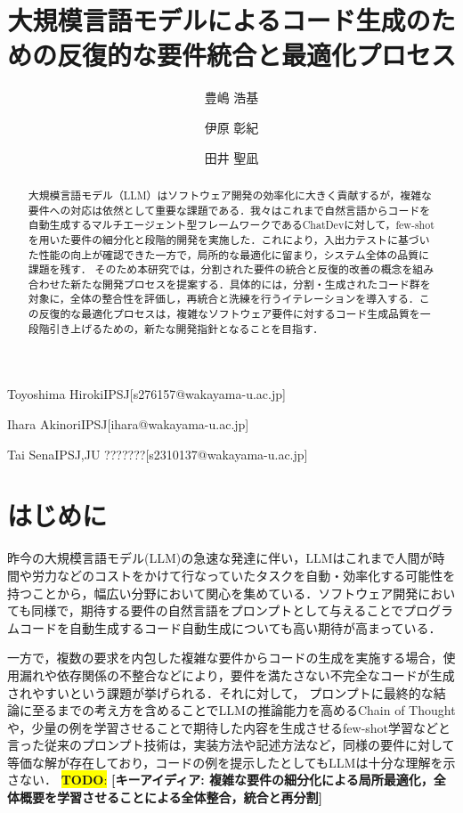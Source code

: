 \documentclass[submit,techrep,noauthor]{ipsj}
\newcommand{\todo}[1]{\colorbox{yellow}{{\bf TODO}:}{\color{red} {\textbf{[#1]}}}}
\begin{document}
\title{大規模言語モデルによるコード生成のための反復的な要件統合と最適化プロセス\\}




\author{豊嶋 浩基}{Toyoshima Hiroki}{IPSJ}[s276157@wakayama-u.ac.jp]
\author{伊原 彰紀}{Ihara Akinori}{IPSJ}[ihara@wakayama-u.ac.jp]
\author{田井 聖凪}{Tai Sena}{IPSJ,JU ???????}[s2310137@wakayama-u.ac.jp]

\begin{abstract}
大規模言語モデル（LLM）はソフトウェア開発の効率化に大きく貢献するが，複雑な要件への対応は依然として重要な課題である．我々はこれまで自然言語からコードを自動生成するマルチエージェント型フレームワークであるChatDevに対して，few-shotを用いた要件の細分化と段階的開発を実施した．これにより，入出力テストに基づいた性能の向上が確認できた一方で，局所的な最適化に留まり，システム全体の品質に課題を残す．
そのため本研究では，分割された要件の統合と反復的改善の概念を組み合わせた新たな開発プロセスを提案する．具体的には，分割・生成されたコード群を対象に，全体の整合性を評価し，再統合と洗練を行うイテレーションを導入する．この反復的な最適化プロセスは，複雑なソフトウェア要件に対するコード生成品質を一段階引き上げるための，新たな開発指針となることを目指す．

\end{abstract}


\maketitle

\section{はじめに}
昨今の大規模言語モデル(LLM)の急速な発達に伴い，LLMはこれまで人間が時間や労力などのコストをかけて行なっていたタスクを自動・効率化する可能性を持つことから，幅広い分野において関心を集めている．ソフトウェア開発においても同様で，期待する要件の自然言語をプロンプトとして与えることでプログラムコードを自動生成するコード自動生成についても高い期待が高まっている．
 
一方で，複数の要求を内包した複雑な要件からコードの生成を実施する場合，使用漏れや依存関係の不整合などにより，要件を満たさない不完全なコードが生成されやすいという課題が挙げられる．それに対して， プロンプトに最終的な結論に至るまでの考え方を含めることでLLMの推論能力を高めるChain of Thoughtや，少量の例を学習させることで期待した内容を生成させるfew-shot学習などと言った従来のプロンプト技術は，実装方法や記述方法など，同様の要件に対して等価な解が存在しており，コードの例を提示したとしてもLLMは十分な理解を示さない．
\todo{キーアイディア: 複雑な要件の細分化による局所最適化，全体概要を学習させることによる全体整合，統合と再分割}
\end{document}
